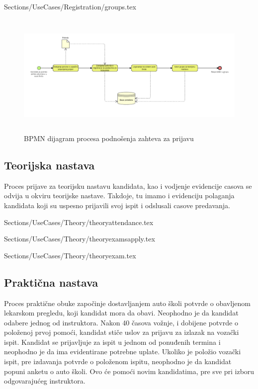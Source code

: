  {Sections/UseCases/Registration/groups.tex}

\begin{figure}[H]
    \begin{center}
        \includegraphics[width=120mm, height=60mm]{Diagrams/bpmn_podnosenje_zahteva.png}
    \end{center}
    \caption {BPMN dijagram procesa podnošenja zahteva za prijavu}
    \label{bpmn_podnosenje_zahteva}

\end{figure}


\subsection {Teorijska nastava}
Proces prijave za teorijsku nastavu kandidata, kao i vodjenje evidencije casova se odvija u okviru teorijske nastave. Takdoje, tu imamo i evidenciju polaganja kandidata koji su uspesno prijavili svoj ispit i odslusali casove predavanja.

 {Sections/UseCases/Theory/theoryattendance.tex}

 {Sections/UseCases/Theory/theoryexamsapply.tex}

 {Sections/UseCases/Theory/theoryexam.tex}

\subsection {Praktična nastava}
Proces praktične obuke započinje dostavljanjem auto školi potvrde o obavljenom lekarskom pregledu, koji kandidat mora da obavi. Neophodno je da kandidat odabere jednog od instruktora. Nakon 40 časova vožnje, i dobijene potvrde o položenoj prvoj pomoći, kandidat stiče uslov za prijavu za izlazak na vozački ispit. Kandidat se prijavljuje za ispit u jednom od ponuđenih termina i neophodno je da ima evidentirane potrebne uplate. Ukoliko je položio vozački ispit, pre izdavanja potvrde o položenom ispitu, neophodno je da kandidat popuni anketu o auto školi. Ovo će pomoći novim kandidatima, pre sve pri izboru odgovarajućeg instruktora.

